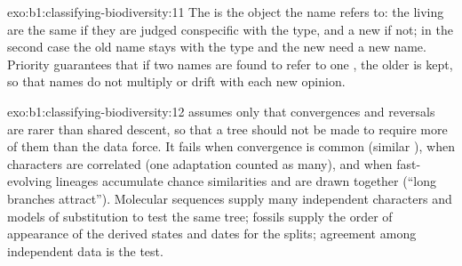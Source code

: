\begin{solution}{exo:b1:classifying-biodiversity:11}
The  is the object the name refers to: the living
 are the same  if they are judged conspecific with
the type, and a new  if not; in the second case the old name
stays with the type and the new  need a new name. Priority
guarantees that if two names are found to refer to one , the
older is kept, so that names do not multiply or drift with each new
opinion.
\end{solution}

\begin{solution}{exo:b1:classifying-biodiversity:12}
 assumes only that convergences and reversals are rarer
than shared descent, so that a tree should not be made to require
more of them than the data force. It fails when convergence is common
(similar ), when characters are correlated (one adaptation
counted as many), and when fast-evolving lineages accumulate chance
similarities and are drawn together (``long branches attract'').
Molecular sequences supply many independent characters and models of
substitution to test the same tree; fossils supply the order of
appearance of the derived states and dates for the splits; agreement
among independent data is the test.
\end{solution}

